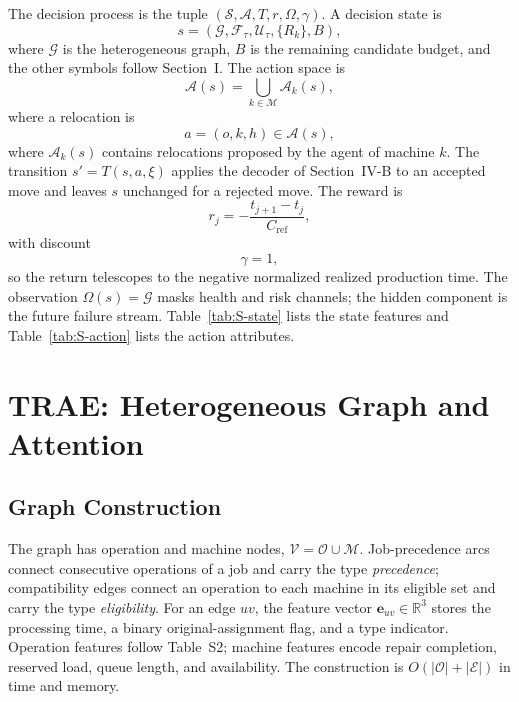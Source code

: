 \documentclass[conference]{IEEEtran}
\theoremstyle{remark}
\newcommand{\cA}{\mathcal{A}}
\newcommand{\cE}{\mathcal{E}}
\newcommand{\cO}{\mathcal{O}}
\newcommand{\cU}{\mathcal{U}}
\newcommand{\cF}{\mathcal{F}}
\newcommand{\cM}{\mathcal{M}}
\newcommand{\cV}{\mathcal{V}}
\newcommand{\cG}{\mathcal{G}}
\newcommand{\cS}{\mathcal{S}}
\begin{document}
The decision process is the tuple $(\cS,\cA,T,r,\Omega,\gamma)$. A decision state is
\begin{equation}
s=(\cG,\cF_\tau,\cU_\tau,\{R_k\},B),
\label{eq:S-state}
\end{equation}
where $\cG$ is the heterogeneous graph, $B$ is the remaining candidate budget, and the other symbols follow Section~I. The action space is
\begin{equation}
\cA(s)=\bigcup_{k\in\cM}\cA_k(s),
\label{eq:S-action}
\end{equation}
where a relocation is
\begin{equation}
a=(o,k,h)\in\cA(s),
\label{eq:S-reloc}
\end{equation}
where $\cA_k(s)$ contains relocations proposed by the agent of machine $k$. The transition $s'=T(s,a,\xi)$ applies the decoder of Section~IV-B to an accepted move and leaves $s$ unchanged for a rejected move. The reward is
\begin{equation}
r_j=-\frac{t_{j+1}-t_j}{C_{\mathrm{ref}}},
\label{eq:S-reward}
\end{equation}
with discount
\begin{equation}
\gamma=1,
\label{eq:S-gamma}
\end{equation}
so the return telescopes to the negative normalized realized production time. The observation $\Omega(s)=\cG$ masks health and risk channels; the hidden component is the future failure stream. Table~\ref{tab:S-state} lists the state features and Table~\ref{tab:S-action} lists the action attributes.

\section{TRAE: Heterogeneous Graph and Attention}
\label{sec:S-graph}

\subsection{Graph Construction}
\label{sec:S-construction}

The graph has operation and machine nodes, $\cV=\cO\cup\cM$. Job-precedence arcs connect consecutive operations of a job and carry the type \emph{precedence}; compatibility edges connect an operation to each machine in its eligible set and carry the type \emph{eligibility}. For an edge $uv$, the feature vector $\bm{e}_{uv}\in\mathbb{R}^{3}$ stores the processing time, a binary original-assignment flag, and a type indicator. Operation features follow Table~S2; machine features encode repair completion, reserved load, queue length, and availability. The construction is $O(|\cO|+|\cE|)$ in time and memory.
\end{document}
